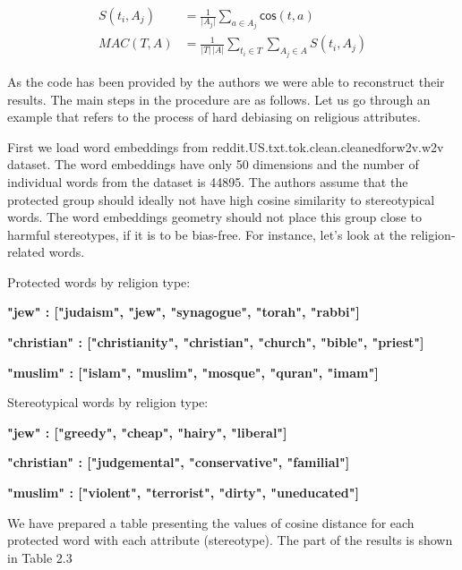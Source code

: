 \documentclass[12pt,]{book}
\begin{document}
\begin{align}
S(t_i, A_j) & = \frac{1}{\vert A_j\vert}\sum_{a\in A_j}\mathsf{cos}(t,a) \\
MAC(T,A) & = \frac{1}{\vert T \vert \,\vert A\vert}\sum_{t_i \in T }\sum_{A_j \in A} S(t_i,A_j)
\end{align}

As the code has been provided by the authors we were able to reconstruct
their results. The main steps in the procedure are as follows. Let us go
through an example that refers to the process of hard debiasing on
religious attributes.

First we load word embeddings from
reddit.US.txt.tok.clean.cleanedforw2v.w2v dataset. The word embeddings
have only 50 dimensions and the number of individual words from the
dataset is 44895. The authors assume that the protected group should
ideally not have high cosine similarity to stereotypical words. The word
embeddings geometry should not place this group close to harmful
stereotypes, if it is to be bias-free. For instance, let's look at the
religion-related words.

Protected words by religion type:

\textbf{"jew"       : ["judaism", "jew", "synagogue", "torah", "rabbi"]}

\textbf{"christian" : ["christianity", "christian", "church", "bible", "priest"]}

\textbf{"muslim"    : ["islam", "muslim", "mosque", "quran", "imam"]}

Stereotypical words by religion type:

\textbf{"jew"       : ["greedy", "cheap", "hairy", "liberal"]}

\textbf{"christian"       : ["judgemental", "conservative", "familial"]}

\textbf{"muslim"       : ["violent", "terrorist", "dirty", "uneducated"]}

We have prepared a table presenting the values of cosine distance for
each protected word with each attribute (stereotype). The part of the
results is shown in Table 2.3

\footnotesize 
\end{document}

